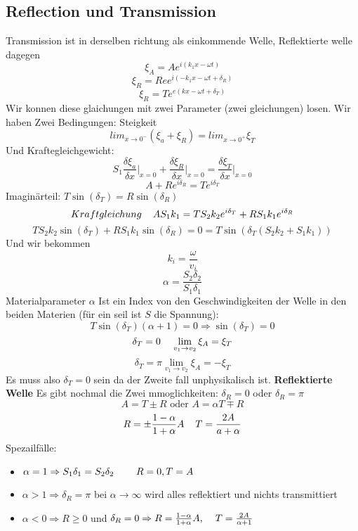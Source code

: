 \documentclass{article}
\newcommand{\mspc}{\hspace{0.4cm}}
\begin{document}
\subsection{Reflection und Transmission} Transmission ist in derselben richtung als einkommende Welle, Reflektierte welle dagegen
\[\xi_A=Ae^{i(k_1x-\omega t)}\]
\[\xi_R=Ree^{i(-k_1x-\omega t +\delta_R)}\]
\[\xi_R=Te^{e(kx-\omega t +\delta_T)}\]
Wir konnen diese glaichungen mit zwei Parameter (zwei gleichungen) losen.
\newline Wir haben Zwei Bedingungen:
\newline Steigkeit\[lim_{x\rightarrow 0^-}(\xi_a+\xi_R)=lim_{x\rightarrow0^+}\xi_T\]
Und Kraftegleichgewicht:\[S_1\frac{\delta\xi_a}{\delta x}\left.\right|_{x=0}+\frac{\delta\xi_R}{\delta x}\left.\right|_{x=0}=\frac{\delta\xi_T}{\delta x}\left.\right|_{x=0}\]
\[A+Re^{i\delta_R}=Te^{i\delta_T}\]
Imaginärteil: $T\sin(\delta_T)=R\sin(\delta_R)$
\[Kraftgleichung\mspc AS_1k_1=TS_2k_2e^{i\delta_T}+RS_1k_1e^{i\delta_R}\]
\[TS_2k_2\sin(\delta_T)+RS_1k_1\sin(\delta_R)=0=T\sin(\delta_T(S_2k_2+S_1k_1))\]
Und wir bekommen
\[k_i=\frac{\omega}{v_i}\]
\[\alpha=\frac{S_2\delta_2}{S_1\delta_1}\]
Materialparameter $\alpha$ Ist ein Index von den Geschwindigkeiten der Welle in den beiden Materien (für ein seil ist $S$ die Spannung):\[T\sin(\delta_T)(\alpha+1)=0\Rightarrow\sin(\delta_T)=0\]
  \[\delta_T=0\mspc\lim_{v_1\rightarrow v_2}\xi_A=\xi_T\]
  \[\delta_T=\pi\lim_{v_1\rightarrow v_2}\xi_A=-\xi_T\]
Es muss also $\delta_T=0$ sein da der Zweite fall unphysikalisch ist.
\newline\textbf{Reflektierte Welle}
Es gibt nochmal die Zwei mmoglichkeiten: $\delta_R=0$ oder $\delta_R=\pi$ 
\[A=T\pm R \text{ oder } A=\alpha T\mp R\]
\[R=\pm\frac{1-\alpha}{1+\alpha}A\mspc T=\frac{2A}{a+\alpha}\]
Spezailfälle:

\begin{itemize}
\item{$\alpha=1\Rightarrow S_1\delta_1=S_2\delta_2\mspc\mspc R=0, T=A$}
\item{$\alpha>1\Rightarrow\delta_R=\pi$ bei $\alpha\rightarrow\infty$ wird alles reflektiert und nichts transmittiert}
\item{$\alpha<0\Rightarrow R\ge0$ und  $\delta_R=0\Rightarrow R=\frac{1-\alpha}{1+\alpha}A,\mspc T=\frac{2A}{\alpha+1}$}
\end{itemize}
\end{document}
